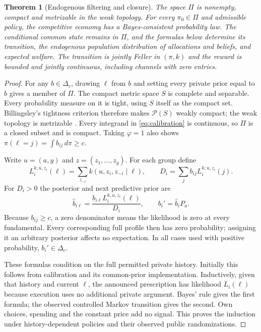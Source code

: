 \documentclass[11pt,a4paper]{article}
\newtheorem{theorem}{Theorem}
\newcommand{\cP}{\mathcal P}
\newcommand{\dd}{\,d}
\begin{document}
\begin{theorem}[Endogenous filtering and closure]\label{thm:closure}
The space $\Pi$ is nonempty, compact and metrizable in the weak topology.
For every $\pi_0\in\Pi$ and admissible policy, the competitive economy has
a Bayes-consistent probability law. The conditional common state remains in
$\Pi$, and the formulas below determine its transition, the endogenous
population distribution of allocations and beliefs, and expected welfare.
The transition is jointly Feller in $(\pi,k)$ and the reward is bounded and
jointly continuous, including channels with zero entries.
\end{theorem}
\begin{proof}
For any $b\in\Delta_c$, drawing $\ell$ from $b$ and setting every private
prior equal to $b$ gives a member of $\Pi$. The compact metric space $S$ is
complete and separable. Every probability measure on it is tight, using $S$
itself as the compact set. Billingsley's tightness criterion
\cite[Section 4, Theorem 4.1, p.10]{billingsley} therefore makes $\cP(S)$
weakly compact; the weak topology is metrizable
\cite[Section 2, p.5]{billingsley}. Every integrand in \eqref{eq:calibration} is
continuous, so $\Pi$ is a closed subset and is compact. Taking $\varphi=1$
also shows $\pi(\ell=j)=\int b_{ij}\dd\pi\geq c$.

Write $u=(a,y)$ and $z=(z_1,\ldots,z_g)$. For each group define
\[
 L_i^{k,u,z_i}(\ell)=\sum_{z_{-i}}k(u,z_i,z_{-i}\mid\ell),
 \qquad D_i=\sum_jb_{ij}L_i^{k,u,z_i}(j).
\]
For $D_i>0$ the posterior and next predictive prior are
\begin{equation}\label{eq:filter}
 \widehat b_{i\ell}=\frac{b_{i\ell}L_i^{k,u,z_i}(\ell)}{D_i},
 \qquad b_i'=\widehat b_iP_a.
\end{equation}
Because $b_{ij}\geq c$, a zero denominator means the likelihood is zero at
every fundamental. Every corresponding full profile then has zero probability;
assigning it an arbitrary posterior affects no expectation. In all cases
used with positive probability, $b_i'\in\Delta_c$.

These formulas condition on the full permitted private history. Initially
this follows from calibration and its common-prior implementation. Inductively,
given that history and current $\ell$, the announced prescription has likelihood
$L_i(\ell)$ because execution uses no additional private argument. Bayes' rule
gives the first formula; the observed controlled Markov transition gives the
second. Own choices, spending and the constant price add no signal. This proves
the induction under history-dependent policies and their observed public
randomizations.


\end{proof}
\end{document}
